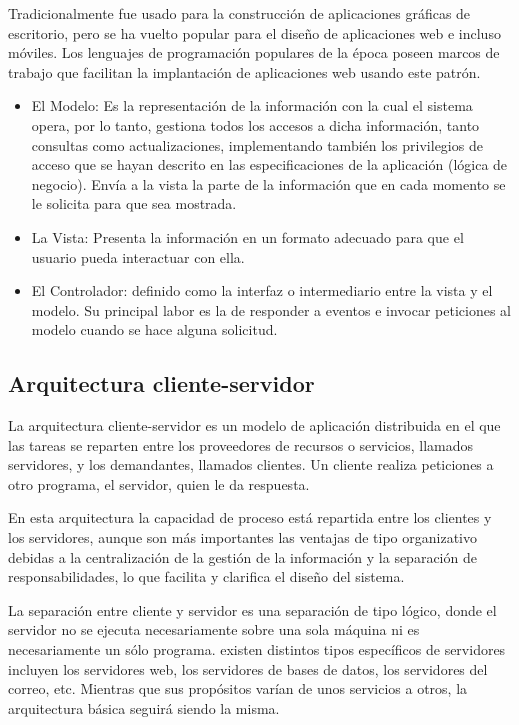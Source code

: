 Tradicionalmente fue usado para la construcción de aplicaciones gráficas de escritorio, pero se ha vuelto popular para el diseño de aplicaciones web e incluso móviles. Los lenguajes de programación populares de la época poseen marcos de trabajo que facilitan la implantación de aplicaciones web usando este patrón.

\begin{itemize}

\item El Modelo: Es la representación de la información con la cual el sistema opera, por lo tanto, gestiona todos los accesos a dicha información, tanto consultas como actualizaciones, implementando también los privilegios de acceso que se hayan descrito en las especificaciones de la aplicación (lógica de negocio). Envía a la vista la parte de la información que en cada momento se le solicita para que sea mostrada.

\item La Vista: Presenta la información en un formato adecuado para que el usuario pueda interactuar con ella.

\item El Controlador: definido como la interfaz o intermediario entre la vista y el modelo. Su principal labor es la de responder a eventos e invocar peticiones al modelo cuando se hace alguna solicitud. 

\end{itemize}

\subsection{Arquitectura cliente-servidor}

La arquitectura cliente-servidor es un modelo de aplicación distribuida en el que las tareas se reparten entre los proveedores de recursos o servicios, llamados servidores, y los demandantes, llamados clientes. Un cliente realiza peticiones a otro programa, el servidor, quien le da respuesta.

En esta arquitectura la capacidad de proceso está repartida entre los clientes y los servidores, aunque son más importantes las ventajas de tipo organizativo debidas a la centralización de la gestión de la información y la separación de responsabilidades, lo que facilita y clarifica el diseño del sistema.

La separación entre cliente y servidor es una separación de tipo lógico, donde el servidor no se ejecuta necesariamente sobre una sola máquina ni es necesariamente un sólo programa. existen distintos tipos específicos de servidores incluyen los servidores web, los servidores de bases de datos, los servidores del correo, etc. Mientras que sus propósitos varían de unos servicios a otros, la arquitectura básica seguirá siendo la misma.

